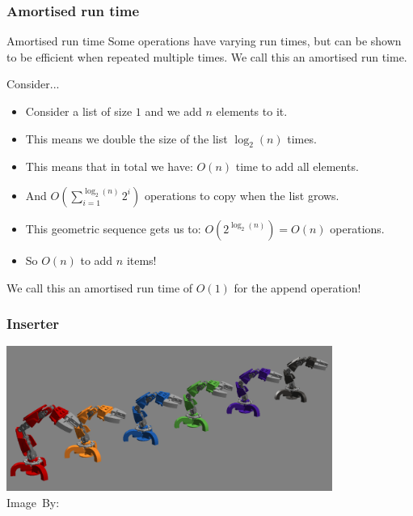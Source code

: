 \begin{frame}
	\frametitle{Amortised run time}
	\begin{block}{Amortised run time}
		Some operations have varying run times, but can be shown to be efficient when repeated multiple times. We call
		this an amortised run time.
	\end{block}	
	\pause
	\begin{exampleblock}{Consider...}
		\small
		\begin{itemize}
			\item Consider a list of size $1$ and we add $n$ elements to it.
				\vspace{-5pt}
				\pause
			\item This means we double the size of the list $\log_2(n)$ times.
				\vspace{-5pt}
				\pause
			\item This means that in total we have: $O(n)$ time to add all elements.
				\vspace{-5pt}
				\pause
			\item And $O\left(\sum\limits_{i=1}^{\log_2(n)} 2^i\right)$ operations to copy when the list grows.
				\vspace{-5pt}
			\item This geometric sequence gets us to: $O(2^{\log_2(n)}) = O(n)$ operations.
				\vspace{-5pt}
				\pause
			\item So $O(n)$ to add $n$ items!
				\vspace{-5pt}
		\end{itemize}
		\pause
		We call this an amortised run time of $O(1)$ for the append operation!
	\end{exampleblock}	
\end{frame}

\begin{frame}
	\frametitle{Inserter}
	\begin{center}
		\includegraphics[width=0.8\textwidth]{figures/inserter.png}\\
		\hspace*{15pt}\hbox{\scriptsize Image By:}
	\end{center}
\end{frame}

